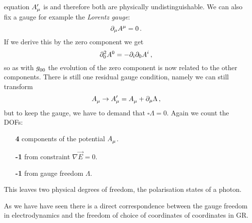 equation $\tensor*{A}{*_\mu^\prime}$ is and therefore both are physically
undistinguishable. We can also fix a gauge for example the \emph{Lorentz gauge}:
\begin{equation}
\partial_\mu\tensor{A}{^\mu}=0\, .
\end{equation}
If we derive this by the zero component we get
\begin{equation}
\partial_{0}^2\tensor{A}{^0}=-\partial_i\partial_0\tensor{A}{^i}\, ,
\end{equation}
so as with $\tensor{g}{_0_0}$ the evolution of the zero component is now related
to the other components. There is still one residual gauge condition, namely we can
still transform
\begin{equation}
\tensor{A}{_\mu}\to\tensor*{A}{*_\mu^\prime}=
\tensor{A}{_\mu}+\partial_\mu\Lambda\, ,
\end{equation}
but to keep the gauge, we have to demand that $\square\Lambda=0$.
Again we count the DOFs:
\begin{itemize}
  \item[\color{section_color}\textsf{\textbf{4}}] components of the potential
  $\tensor{A}{_\mu}$.
  \item[\color{section_color}\textsf{\textbf{-1}}] from constraint
  $\nabla\vec{E}=0$.
  \item[\color{section_color}\textsf{\textbf{-1}}] from gauge freedom
  $\Lambda$.
\end{itemize}
This leaves two physical degrees of freedom, the polarisation states of a
photon.
\begin{remark}
As we have have seen there is a direct correspondence between the gauge freedom
in electrodynamics and the freedom of choice of coordinates of coordinates in
GR.
\end{remark}

